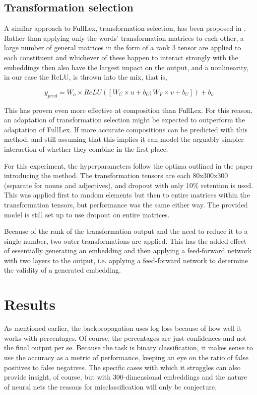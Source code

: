 \documentclass[a4paper, 12pt]{article}
\begin{document}
\subsection{Transformation selection}
A similar approach to FullLex, transformation selection, has been proposed in \cite{TSelect}. Rather than applying only the words' transformation matrices to each other, a large number of general matrices in the form of a rank 3 tensor are applied to each constituent and whichever of these happen to interact strongly with the embeddings then also have the largest impact on the output, and a nonlinearity, in our case the ReLU, is thrown into the mix, that is,

\begin{equation} \label{eq:6}
	y_{pred} = W_o \times ReLU([W_U \times u + b_U; W_V \times v + b_U]) + b_o
\end{equation}

This has proven even more effective at composition than FullLex. For this reason, an adaptation of transformation selection might be expected to outperform the adaptation of FullLex. If more accurate compositions can be predicted with this method, and still assuming that this implies it can model the arguably simpler interaction of whether they combine in the first place.

For this experiment, the hyperparameters follow the optima outlined in the paper introducing the method. The transformation tensors are each 80x300x300 (separate for nouns and adjectives), and dropout with only 10\% retention is used. This was applied first to random elements but then to entire matrices within the transformation tensors, but performance was the same either way. The provided model is still set up to use dropout on entire matrices.

Because of the rank of the transformation output and the need to reduce it to a single number, two outer transformations are applied. This has the added effect of essentially generating an embedding and then applying a feed-forward network with two layers to the output, i.e. applying a feed-forward network to determine the validity of a generated embedding.


\section{Results}

As mentioned earlier, the backpropagation uses log loss because of how well it works with percentages. Of course, the percentages are just confidences and not the final output per se. Because the task is binary classification, it makes sense to use the accuracy as a metric of performance, keeping an eye on the ratio of false positives to false negatives. The specific cases with which it struggles can also provide insight, of course, but with 300-dimensional embeddings and the nature of neural nets the reasons for misclassification will only be conjecture.
\end{document}
